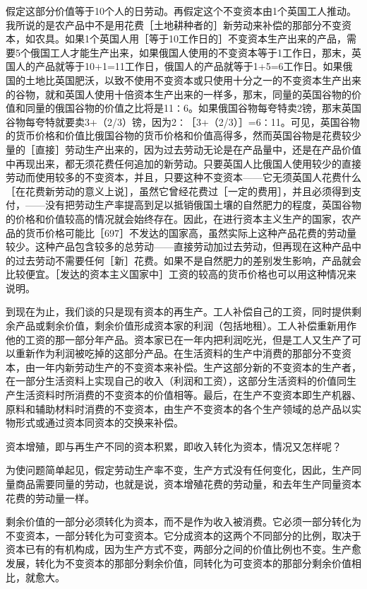 假定这部分价值等于10个人的日劳动。再假定这个不变资本由1个英国工人推动。我所说的是农产品中不是用花费［土地耕种者的］新劳动来补偿的那部分不变资本，如农具。如果1个英国人用［等于10工作日的］不变资本生产出来的产品，需要5个俄国工人才能生产出来，如果俄国人使用的不变资本等于1工作日，那末，英国人的产品就等于10+1=11工作日，俄国人的产品就等于1+5=6工作日。如果俄国的土地比英国肥沃，以致不使用不变资本或只使用十分之一的不变资本生产出来的谷物，就和英国人使用十倍资本生产出来的一样多，那末，同量的英国谷物的价值和同量的俄国谷物的价值之比将是11∶6。如果俄国谷物每夸特卖2镑，那末英国谷物每夸特就要卖3+（2/3）镑，因为2∶［3+（2/3）］=6∶11。可见，英国谷物的货币价格和价值比俄国谷物的货币价格和价值高得多，然而英国谷物是花费较少量的［直接］劳动生产出来的，因为过去劳动无论是在产品量中，还是在产品价值中再现出来，都无须花费任何追加的新劳动。只要英国人比俄国人使用较少的直接劳动而使用较多的不变资本，并且，只要这种不变资本——它无须英国人花费什么［在花费新劳动的意义上说］，虽然它曾经花费过［一定的费用］，并且必须得到支付，——没有把劳动生产率提高到足以抵销俄国土壤的自然肥力的程度，英国谷物的价格和价值较高的情况就会始终存在。因此，在进行资本主义生产的国家，农产品的货币价格可能比［697］不发达的国家高，虽然实际上这种产品花费的劳动量较少。这种产品包含较多的总劳动——直接劳动加过去劳动，但再现在这种产品中的过去劳动不需要任何［新］花费。如果不是自然肥力的差别发生影响，产品就会比较便宜。［发达的资本主义国家中］工资的较高的货币价格也可以用这种情况来说明。

到现在为止，我们谈的只是现有资本的再生产。工人补偿自己的工资，同时提供剩余产品或剩余价值，剩余价值形成资本家的利润（包括地租）。工人补偿重新用作他的工资的那一部分年产品。资本家已在一年内把利润吃光，但是工人又生产了可以重新作为利润被吃掉的这部分产品。在生活资料的生产中消费的那部分不变资本，由一年内新劳动生产的不变资本来补偿。生产这部分新的不变资本的生产者，在一部分生活资料上实现自己的收入（利润和工资），这部分生活资料的价值同生产生活资料时所消费的不变资本的价值相等。最后，在生产不变资本即生产机器、原料和辅助材料时消费的不变资本，由生产不变资本的各个生产领域的总产品以实物形式或通过资本同资本的交换来补偿。


资本增殖，即与再生产不同的资本积累，即收入转化为资本，情况又怎样呢？

为使问题简单起见，假定劳动生产率不变，生产方式没有任何变化，因此，生产同量商品需要同量的劳动，也就是说，资本增殖花费的劳动量，和去年生产同量资本花费的劳动量一样。

剩余价值的一部分必须转化为资本，而不是作为收入被消费。它必须一部分转化为不变资本，一部分转化为可变资本。它分成资本的这两个不同部分的比例，取决于资本已有的有机构成，因为生产方式不变，两部分之间的价值比例也不变。生产愈发展，转化为不变资本的那部分剩余价值，同转化为可变资本的那部分剩余价值相比，就愈大。


